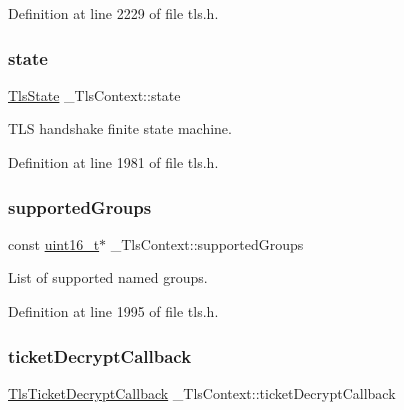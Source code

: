 Definition at line 2229 of file tls.\+h.

\mbox{\label{struct__TlsContext_a5610d9db8b1a8cd1c32e3aae456be72b}} 
\subsubsection{\texorpdfstring{state}{state}}
{\footnotesize\ttfamily \hyperlink{tls_8h_a02bb4c8aa7988b33fe4d4836d8ff4a4d}{Tls\+State} \+\_\+\+Tls\+Context\+::state}



T\+LS handshake finite state machine. 



Definition at line 1981 of file tls.\+h.

\mbox{\label{struct__TlsContext_aa72a68ae5e2e8d84e69a907f49b3437b}} 
\subsubsection{\texorpdfstring{supported\+Groups}{supportedGroups}}
{\footnotesize\ttfamily const \hyperlink{stdint_8h_a273cf69d639a59973b6019625df33e30}{uint16\+\_\+t}$\ast$ \+\_\+\+Tls\+Context\+::supported\+Groups}



List of supported named groups. 



Definition at line 1995 of file tls.\+h.

\mbox{\label{struct__TlsContext_a090b9f9cf093cae621d142c2a61227e1}} 
\subsubsection{\texorpdfstring{ticket\+Decrypt\+Callback}{ticketDecryptCallback}}
{\footnotesize\ttfamily \hyperlink{tls_8h_aaa1312868adabe84a91c54f830669789}{Tls\+Ticket\+Decrypt\+Callback} \+\_\+\+Tls\+Context\+::ticket\+Decrypt\+Callback}



